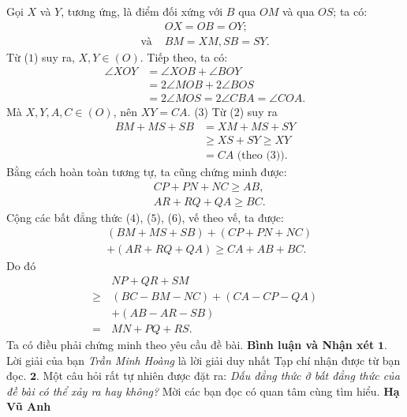 \begin{multicols}{2}
\begin{figure}[H]
	\end{figure}
	Gọi $X$ và $Y$, tương ứng, là điểm đối xứng với $B$ qua $OM$ và qua $OS$; ta có:
	\begin{align*}
		&OX = OB = OY; \tag{$1$}\\
		\text{và } &BM = XM, SB = SY. \tag{$2$}
	\end{align*}
	Từ ($1$) suy ra, $X, Y \in (O)$.
	\vskip 0.05cm
	Tiếp theo, ta có:
	\begin{align*}
		\angle XOY &= \angle XOB + \angle BOY \\
		&= 2\angle MOB + 2\angle BOS \\
		&= 2\angle MOS = 2\angle CBA = \angle COA.
	\end{align*}
	Mà $X, Y, A, C \in (O)$, nên $XY = CA$. \hfill ($3$)
	\vskip 0.05cm
	Từ ($2$) suy ra
	\begin{align*}
		BM + MS + SB &= XM + MS + SY \\
		&\ge XS + SY \ge XY \\
		&= CA \text{ (theo ($3$))}. \tag{$4$}  
	\end{align*}
	Bằng cách hoàn toàn tương tự, ta cũng chứng minh được:
	\begin{align*}
		&CP + PN + NC \ge AB,   \tag{$5$}\\
		&AR + RQ + QA \ge BC.  \tag{$6$}
	\end{align*}                      
	Cộng các bất đẳng thức ($4$), ($5$), ($6$), vế theo vế, ta được:
	\begin{align*}
		&(BM + MS + SB) + (CP + PN + NC) \\
		&+ (AR + RQ + QA) \ge CA + AB + BC.	
	\end{align*}
	Do đó
	\begin{align*}
		&NP + QR + SM\\
		\ge &(BC - BM - NC) + (CA - CP - QA) \\
		&+ (AB - AR - SB)\\
		= \,&MN + PQ + RS.
	\end{align*}
	Ta có điều phải chứng minh theo yêu cầu đề bài.
	\vskip 0.05cm
	\textbf{\color{thachthuctoanhoc}Bình luận và Nhận xét}
	\vskip 0.05cm
	$\pmb{1.}$ Lời giải của bạn \textit{Trần Minh Hoàng} là lời giải duy nhất Tạp chí nhận được từ bạn đọc.
	\vskip 0.05cm
	$\pmb{2.}$ Một câu hỏi rất tự nhiên được đặt ra: \textit{Dấu đẳng thức ở bất đẳng thức của đề bài có thể xảy ra hay không?} Mời các bạn đọc có quan tâm cùng tìm hiểu.
	\vskip 0.05cm
	\hfill	\textbf{\color{thachthuctoanhoc}Hạ Vũ Anh}
	\vskip 0.05cm
	{}

\end{multicols}
